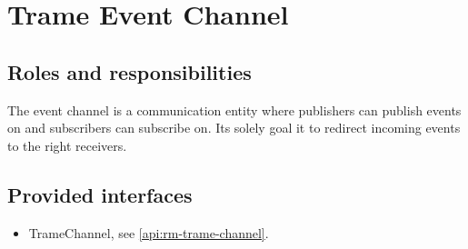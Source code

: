 \section{Trame Event Channel}
\label{element:rm-trame-event-channel}

\subsection{Roles and responsibilities}

\npar The event channel is a communication entity where publishers can publish
events on and subscribers can subscribe on. Its solely goal it to redirect
incoming events to the right receivers.

\subsection{Provided interfaces}

\begin{itemize}
  \item TrameChannel, see \ref{api:rm-trame-channel}.
\end{itemize}